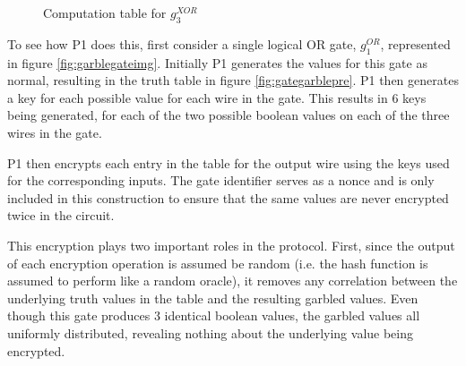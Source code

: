 \begin{figure}[t!]
    \caption{Computation table for $g^{XOR}_3$}
    \label{fig:xorgate}
\end{figure}

To see how \ac{P1} does this, first consider a single logical OR gate, $g^{OR}_1$, represented in figure \ref{fig:garblegateimg}. Initially \ac{P1} generates the values for this gate as normal, resulting in the truth table in figure \ref{fig:gategarblepre}. \ac{P1} then generates a key for each possible value for each wire in the gate.  This results in 6 keys being generated, for each of the two possible boolean values on each of the three wires in the gate.

\ac{P1} then encrypts each entry in the table for the output wire using the keys used for the corresponding inputs.  The gate identifier serves as a nonce and is only included in this construction to ensure that the same values are never encrypted twice in the circuit.

This encryption plays two important roles in the protocol.  First, since the output of each encryption operation is assumed be random (i.e. the hash function is assumed to perform like a random oracle), it removes any correlation between the underlying truth values in the table and the resulting garbled values. Even though this gate produces 3 identical boolean values, the garbled values all uniformly distributed, revealing nothing about the underlying value being encrypted.

